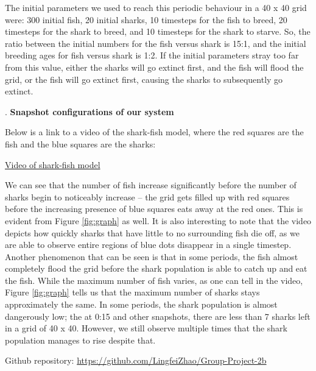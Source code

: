 \documentclass{article}
\begin{document}
The initial parameters we used to reach this periodic behaviour in a 40 x 40 grid were: 300 initial fish, 20 initial sharks, 10 timesteps for the fish to breed, 20 timesteps for the shark to breed, and 10 timesteps for the shark to starve. So, the ratio between the initial numbers for the fish versus shark is 15:1, and the initial breeding ages for fish versus shark is 1:2. If the initial parameters stray too far from this value, either the sharks will go extinct first, and the fish will flood the grid, or the fish will go extinct first, causing the sharks to subsequently go extinct.\par
\bigskip
{}. \textbf{Snapshot configurations of our system}\par
Below is a link to a video of the shark-fish model, where the red squares are the fish and the blue squares are the sharks:\par
\href{https://github.com/LingfeiZhao/Group-Project-2b/blob/master/results/shark%20eat%20fish.mp4}{Video of shark-fish model}\par
We can see that the number of fish increase significantly before the number of sharks begin to noticeably increase -- the grid gets filled up with red squares before the increasing presence of blue squares eats away at the red ones. This is evident from Figure \ref{fig:graph} as well. It is also interesting to note that the video depicts how quickly sharks that have little to no surrounding fish die off, as we are able to observe entire regions of blue dots disappear in a single timestep. Another phenomenon that can be seen is that in some periods, the fish almost completely flood the grid before the shark population is able to catch up and eat the fish. While the maximum number of fish varies, as one can tell in the video, Figure \ref{fig:graph} tells us that the maximum number of sharks stays approximately the same. In some periods, the shark population is almost dangerously low; the at 0:15 and other snapshots, there are less than 7 sharks left in a grid of
40 x 40. However, we still observe multiple times that the shark population manages to rise despite that.\par
\bigskip
\noindent Github repository: \url{https://github.com/LingfeiZhao/Group-Project-2b}
\end{document}
